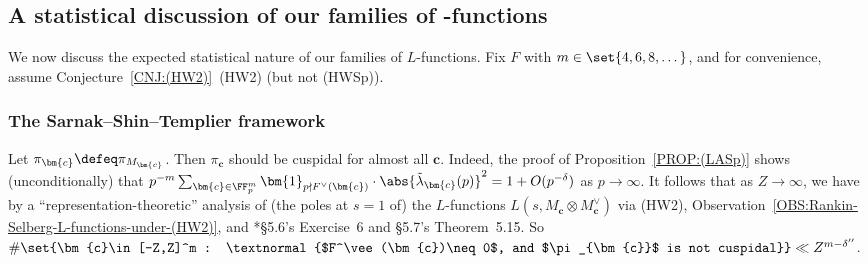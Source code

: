 \documentclass[12pt]{report}
\begin{document}
% 

\subsection{A statistical discussion of our families of -functions}
\label{SUBSEC:discuss-expected-RMT-statistical-nature-of-our-families-of-L-functions}

We now discuss the expected statistical nature of our families of $L$-functions.
Fix $F$ with $m\in\set{4,6,8,\dots}$,
and for convenience,
assume Conjecture~\ref{CNJ:(HW2)}~(HW2) (but not (HWSp)).

\subsubsection{The Sarnak--Shin--Templier framework}

Let $\pi_{\bm{c}}\defeq\pi_{M_{\bm{c}}}$.
Then $\pi_{\bm{c}}$ should be cuspidal for almost all $\bm{c}$.
Indeed,
the proof of Proposition~\ref{PROP:(LASp)} shows (unconditionally) that
$p^{-m}\sum_{\bm{c}\in \FF_p^m} \bm{1}_{p\nmid F^\vee(\bm{c})}
\cdot \abs{\tilde{\lambda}_{\bm{c}}(p)}^2
= 1+O(p^{-\delta})$ as $p\to\infty$.
It follows that
as $Z\to\infty$,
we have
by a ``representation-theoretic'' analysis of (the poles at $s=1$ of) the $L$-functions $L(s,M_{\bm{c}}\otimes M_{\bm{c}}^\vee)$
via (HW2), Observation~\ref{OBS:Rankin-Selberg-L-functions-under-(HW2)}, and \cite{iwaniec2004analytic}*{\S5.6's Exercise~6 and \S5.7's Theorem~5.15}.
So $\#\set{\bm{c}\in[-Z,Z]^m
: \textnormal{$F^\vee(\bm{c})\neq0$, and $\pi_{\bm{c}}$ is not cuspidal}}
\ll Z^{m-\delta''}$.
\end{document}
